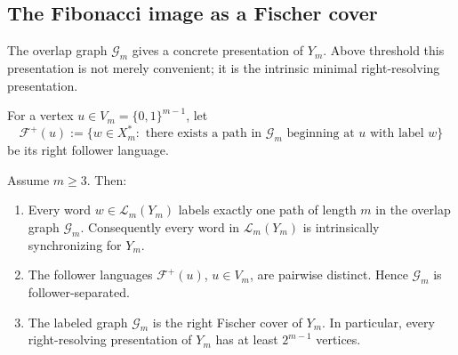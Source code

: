 \subsection{The Fibonacci image as a Fischer cover}

The overlap graph $\mathcal G_m$ gives a concrete presentation of $Y_m$. Above
threshold this presentation is not merely convenient; it is the intrinsic
minimal right-resolving presentation.

For a vertex $u\in V_m=\{0,1\}^{m-1}$, let
\[
\mathcal F^+(u):=
\{w\in X_m^*:\text{ there exists a path in }\mathcal G_m
\text{ beginning at }u\text{ with label }w\}
\]
be its right follower language.

\begin{theorem}
\label{thm:fischer-cover-stabilized-image}
Assume $m\ge3$.  Then:
\begin{enumerate}[label=(\roman*),leftmargin=*,itemsep=2pt]
  \item Every word $w\in\mathcal L_m(Y_m)$ labels exactly one path of length
  $m$ in the overlap graph $\mathcal G_m$. Consequently every word in
  $\mathcal L_m(Y_m)$ is intrinsically synchronizing for $Y_m$.
  \item The follower languages $\mathcal F^+(u)$, $u\in V_m$, are pairwise
  distinct.  Hence $\mathcal G_m$ is follower-separated.
  \item The labeled graph $\mathcal G_m$ is the right Fischer cover of $Y_m$.
  In particular, every right-resolving presentation of $Y_m$ has at least
  $2^{m-1}$ vertices.
\end{enumerate}
\end{theorem}

